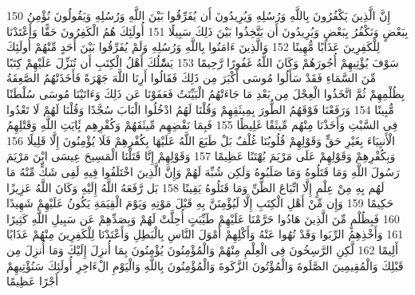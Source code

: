 \documentclass[20pt,a4paper]{article}
\begin{document}
{\tiny\colorbox{cl_aya}{150}} إِنَّ الَّذِينَ يَكْفُرُونَ بِاللَّهِ وَرُسُلِهِ وَيُرِيدُونَ أَن يُفَرِّقُوا بَيْنَ اللَّهِ وَرُسُلِهِ وَيَقُولُونَ نُؤْمِنُ بِبَعْضٍ وَنَكْفُرُ بِبَعْضٍ وَيُرِيدُونَ أَن يَتَّخِذُوا بَيْنَ ذَلِكَ سَبِيلًا
{\tiny\colorbox{cl_aya}{151}} أُولَئِكَ هُمُ الْكَفِرُونَ حَقًّا وَأَعْتَدْنَا لِلْكَفِرِينَ عَذَابًا مُّهِينًا
{\tiny\colorbox{cl_aya}{152}} وَالَّذِينَ ءَامَنُوا بِاللَّهِ وَرُسُلِهِ وَلَمْ يُفَرِّقُوا بَيْنَ أَحَدٍ مِّنْهُمْ أُولَئِكَ سَوْفَ يُؤْتِيهِمْ أُجُورَهُمْ وَكَانَ اللَّهُ غَفُورًا رَّحِيمًا
{\tiny\colorbox{cl_aya}{153}} يَسَْٔلُكَ أَهْلُ الْكِتَبِ أَن تُنَزِّلَ عَلَيْهِمْ كِتَبًا مِّنَ السَّمَاءِ فَقَدْ سَأَلُوا مُوسَى أَكْبَرَ مِن ذَلِكَ فَقَالُوا أَرِنَا اللَّهَ جَهْرَةً فَأَخَذَتْهُمُ الصَّعِقَةُ بِظُلْمِهِمْ ثُمَّ اتَّخَذُوا الْعِجْلَ مِن بَعْدِ مَا جَاءَتْهُمُ الْبَيِّنَتُ فَعَفَوْنَا عَن ذَلِكَ وَءَاتَيْنَا مُوسَى سُلْطَنًا مُّبِينًا
{\tiny\colorbox{cl_aya}{154}} وَرَفَعْنَا فَوْقَهُمُ الطُّورَ بِمِيثَقِهِمْ وَقُلْنَا لَهُمُ ادْخُلُوا الْبَابَ سُجَّدًا وَقُلْنَا لَهُمْ لَا تَعْدُوا فِى السَّبْتِ وَأَخَذْنَا مِنْهُم مِّيثَقًا غَلِيظًا
{\tiny\colorbox{cl_aya}{155}} فَبِمَا نَقْضِهِم مِّيثَقَهُمْ وَكُفْرِهِم بَِٔايَتِ اللَّهِ وَقَتْلِهِمُ الْأَنبِيَاءَ بِغَيْرِ حَقٍّ وَقَوْلِهِمْ قُلُوبُنَا غُلْفٌ بَلْ طَبَعَ اللَّهُ عَلَيْهَا بِكُفْرِهِمْ فَلَا يُؤْمِنُونَ إِلَّا قَلِيلًا
{\tiny\colorbox{cl_aya}{156}} وَبِكُفْرِهِمْ وَقَوْلِهِمْ عَلَى مَرْيَمَ بُهْتَنًا عَظِيمًا
{\tiny\colorbox{cl_aya}{157}} وَقَوْلِهِمْ إِنَّا قَتَلْنَا الْمَسِيحَ عِيسَى ابْنَ مَرْيَمَ رَسُولَ اللَّهِ وَمَا قَتَلُوهُ وَمَا صَلَبُوهُ وَلَكِن شُبِّهَ لَهُمْ وَإِنَّ الَّذِينَ اخْتَلَفُوا فِيهِ لَفِى شَكٍّ مِّنْهُ مَا لَهُم بِهِ مِنْ عِلْمٍ إِلَّا اتِّبَاعَ الظَّنِّ وَمَا قَتَلُوهُ يَقِينًا
{\tiny\colorbox{cl_aya}{158}} بَل رَّفَعَهُ اللَّهُ إِلَيْهِ وَكَانَ اللَّهُ عَزِيزًا حَكِيمًا
{\tiny\colorbox{cl_aya}{159}} وَإِن مِّنْ أَهْلِ الْكِتَبِ إِلَّا لَيُؤْمِنَنَّ بِهِ قَبْلَ مَوْتِهِ وَيَوْمَ الْقِيَمَةِ يَكُونُ عَلَيْهِمْ شَهِيدًا
{\tiny\colorbox{cl_aya}{160}} فَبِظُلْمٍ مِّنَ الَّذِينَ هَادُوا حَرَّمْنَا عَلَيْهِمْ طَيِّبَتٍ أُحِلَّتْ لَهُمْ وَبِصَدِّهِمْ عَن سَبِيلِ اللَّهِ كَثِيرًا
{\tiny\colorbox{cl_aya}{161}} وَأَخْذِهِمُ الرِّبَوا وَقَدْ نُهُوا عَنْهُ وَأَكْلِهِمْ أَمْوَلَ النَّاسِ بِالْبَطِلِ وَأَعْتَدْنَا لِلْكَفِرِينَ مِنْهُمْ عَذَابًا أَلِيمًا
{\tiny\colorbox{cl_aya}{162}} لَّكِنِ الرَّسِخُونَ فِى الْعِلْمِ مِنْهُمْ وَالْمُؤْمِنُونَ يُؤْمِنُونَ بِمَا أُنزِلَ إِلَيْكَ وَمَا أُنزِلَ مِن قَبْلِكَ وَالْمُقِيمِينَ الصَّلَوةَ وَالْمُؤْتُونَ الزَّكَوةَ وَالْمُؤْمِنُونَ بِاللَّهِ وَالْيَوْمِ الْءَاخِرِ أُولَئِكَ سَنُؤْتِيهِمْ أَجْرًا عَظِيمًا
\end{document}
